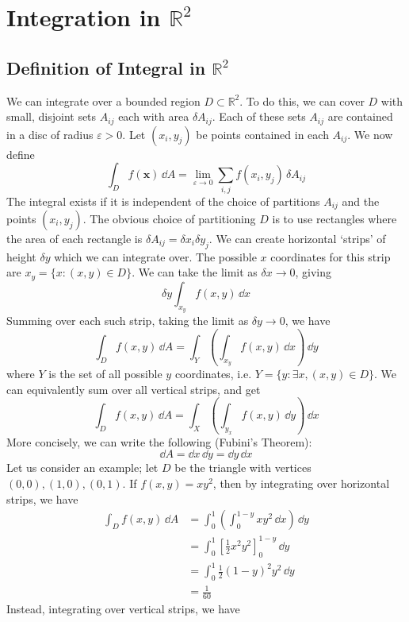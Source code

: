 \documentclass{article}
\begin{document}
\section{Integration in $\mathbb R^2$}
\subsection{Definition of Integral in $\mathbb R^2$}
We can integrate over a bounded region $D \subset \mathbb R^2$. To do this, we can cover $D$ with small, disjoint sets $A_{ij}$ each with area $\delta A_{ij}$. Each of these sets $A_{ij}$ are contained in a disc of radius $\varepsilon > 0$. Let $(x_i, y_j)$ be points contained in each $A_{ij}$. We now define
\[ \int_D f(\bm x) \,\dd A = \lim_{\varepsilon \to 0} \sum_{i, j} f(x_i, y_j) \,\delta A_{ij} \]
The integral exists if it is independent of the choice of partitions $A_{ij}$ and the points $(x_i, y_j)$. The obvious choice of partitioning $D$ is to use rectangles where the area of each rectangle is $\delta A_{ij} = \delta x_i \delta y_j$. We can create horizontal `strips' of height $\delta y$ which we can integrate over. The possible $x$ coordinates for this strip are $x_y = \{ x \colon (x, y) \in D \}$. We can take the limit as $\delta x \to 0$, giving
\[ \delta y \int_{x_y} f(x, y) \,\dd x \]
Summing over each such strip, taking the limit as $\delta y \to 0$, we have
\[ \int_D f(x, y) \,\dd A = \int_Y \left( \int_{x_y} f(x, y) \,\dd x \right) \,\dd y \]
where $Y$ is the set of all possible $y$ coordinates, i.e. $Y = \{ y \colon \exists x, (x, y) \in D \}$. We can equivalently sum over all vertical strips, and get
\[ \int_D f(x, y) \,\dd A = \int_X \left( \int_{y_x} f(x, y) \,\dd y \right) \,\dd x \]
More concisely, we can write the following (Fubini's Theorem):
\[ \dd A = \dd x \, \dd y = \dd y \, \dd x \]
Let us consider an example; let $D$ be the triangle with vertices $(0, 0), (1, 0), (0, 1)$. If $f(x, y) = xy^2$, then by integrating over horizontal strips, we have
\begin{align*}
    \int_D f(x, y) \,\dd A & = \int_0^1 \left( \int_0^{1-y} xy^2 \,\dd x \right) \,\dd y \\
                           & = \int_0^1 \left[ \frac{1}{2}x^2y^2 \right]_0^{1-y} \,\dd y \\
                           & = \int_0^1 \frac{1}{2}(1-y)^2y^2 \,\dd y                    \\
                           & = \frac{1}{60}
\end{align*}
Instead, integrating over vertical strips, we have
\end{document}
